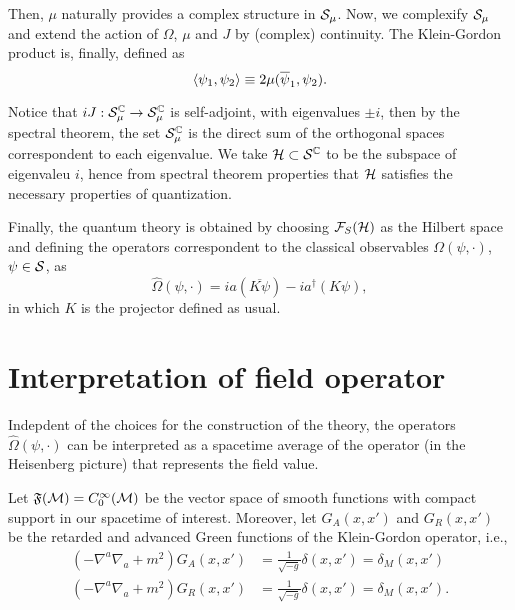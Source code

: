 Then, \(\mu\) naturally provides a complex structure in \({\mathcal{S}}_\mu\). Now, we complexify \({\mathcal{S}}_{\mu}\) and extend the action of \(\Omega\), \(\mu\) and \(J\) by (complex) continuity. The Klein-Gordon product is, finally, defined as
\begin{equation}
    \left\langle \psi_1, \psi_2\right\rangle\equiv 2\mu(\overline{\psi}_1,\psi_2).
\end{equation}

Notice that \(iJ:{\mathcal{S}}^{\mathbb{C}}_\mu\to{\mathcal{S}}^{\mathbb{C}}_\mu\) is self-adjoint, with eigenvalues \(\pm i\), then by the spectral theorem, the set \({\mathcal{S}}^{\mathbb{C}}_\mu\) is the direct sum of the orthogonal spaces correspondent to each eigenvalue. We take \({\mathcal{H}}\subset{\mathcal{S}}^{{\mathbb{C}}}\) to be the subspace of eigenvaleu \(i\), hence from spectral theorem properties that \({\mathcal{H}}\) satisfies the necessary properties of quantization.

Finally, the quantum theory is obtained by choosing \({\mathcal{F}}_S({\mathcal{H}})\) as the Hilbert space and defining the operators correspondent to the classical observables \(\Omega(\psi,\cdot)\), \(\psi\in{\mathcal{S}}\), as
\begin{equation}
    \hat{\Omega}(\psi,\cdot)=ia\left(\overline{K\psi}\right)-ia^{\dagger}\left(K\psi\right),
\end{equation}
in which \(K\) is the projector defined as usual.

\section{Interpretation of field operator}

Indepdent of the choices for the construction of the theory, the operators \(\hat{\Omega}(\psi,\cdot)\) can be interpreted as a spacetime average of the operator (in the Heisenberg picture) that represents the field value.

Let \({\mathfrak{F}}({\mathcal{M}})=C^{\infty}_0({\mathcal{M}})\) be the vector space of smooth functions with compact support in our spacetime of interest. Moreover, let \(G_A(x,x')\) and \(G_R(x,x')\) be the retarded and advanced Green functions of the Klein-Gordon operator, i.e.,
\begin{subequations}
    \begin{align}
        \left(-\nabla^a\nabla_a+m^2\right)G_A(x,x')&=\frac{1}{\sqrt{-g}}\delta(x,x')=\delta_M(x,x')\\
        \left(-\nabla^a\nabla_a+m^2\right)G_R(x,x')&=\frac{1}{\sqrt{-g}}\delta(x,x')=\delta_M(x,x').
    \end{align}
\end{subequations}

